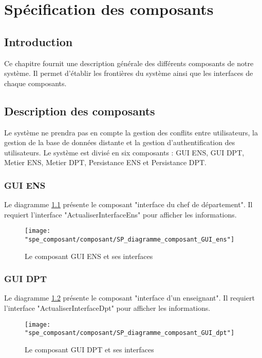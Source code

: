 
\chapter{Spécification des composants}\label{chapter:composants}

\section{Introduction}

    Ce chapitre fournit une description générale des différents composants de notre système. Il permet d'établir les frontières du système ainsi que les interfaces de chaque composants.

\section{Description des composants}
    
    Le système ne prendra pas en compte la gestion des conflits entre utilisateurs, la gestion de la base de données distante et la gestion d'authentification des utilisateurs. Le système est divisé en six composants : GUI ENS, GUI DPT, Metier ENS, Metier DPT, Persistance ENS et Persistance DPT.

    \subsection{GUI ENS}
        Le diagramme \ref{fig:comp-gui-ens} présente le composant "interface du chef de département". Il requiert l'interface "ActualiserInterfaceEns" pour afficher les informations.
        \begin{figure}[h]
        	\centering
        	\texttt{[image: "spe\_composant/composant/SP\_diagramme\_composant\_GUI\_ens"]}
        	\caption{Le composant GUI ENS et ses interfaces}
        	\label{fig:comp-gui-ens}
        \end{figure}
    
    \subsection{GUI DPT}
        Le diagramme \ref{fig:comp-gui-dpt} présente le composant "interface d'un enseignant". Il requiert l'interface "ActualiserInterfaceDpt" pour afficher les informations.
        \begin{figure}[h]
        	\centering
            \texttt{[image: "spe\_composant/composant/SP\_diagramme\_composant\_GUI\_dpt"]}
        	\caption{Le composant GUI DPT et ses interfaces}
        	\label{fig:comp-gui-dpt}
        \end{figure}
    \FloatBarrier
